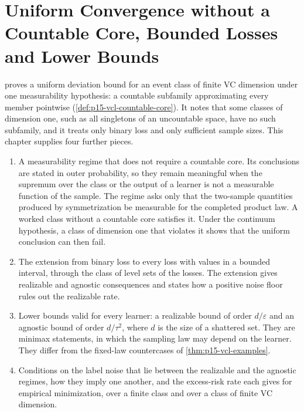 \chapter{Uniform Convergence without a Countable Core, Bounded Losses and Lower Bounds}
\label{sec:p15-w02b-p15-065-beyond-core}

 proves a uniform deviation
bound for an event class of finite VC dimension under one measurability
hypothesis: a countable subfamily approximating every member pointwise
(\cref{def:p15-vcl-countable-core}). It notes that some classes of
dimension one, such as all singletons of an uncountable space, have no such
subfamily, and it treats only binary loss and only sufficient sample sizes.
This chapter supplies four further pieces.
\begin{enumerate}
\item A measurability regime that does not require a countable core. Its
      conclusions are stated in outer probability, so they remain meaningful
      when the supremum over the class or the output of a learner is not a
      measurable function of the sample. The regime asks only that the
      two-sample quantities produced by symmetrization be measurable for the
      completed product law. A worked class without a countable core
      satisfies it. Under the continuum hypothesis, a class of dimension one
      that violates it shows that the uniform conclusion can then fail.
\item The extension from binary loss to every loss with values in a bounded
      interval, through the class of level sets of the losses. The extension
      gives realizable and agnostic consequences and states how a positive
      noise floor rules out the realizable rate.
\item Lower bounds valid for every learner: a realizable bound of order
      \(d/\varepsilon\) and an agnostic bound of order \(d/\tau^2\), where
      \(d\) is the size of a shattered set. They are minimax statements, in
      which the sampling law may depend on the learner. They differ from
      the fixed-law countercases of
      \cref{thm:p15-vcl-examples}.
\item Conditions on the label noise that lie between the realizable and the
      agnostic regimes, how they imply one another, and the excess-risk
      rate each gives for empirical minimization, over a finite class and
      over a class of finite VC dimension.
\end{enumerate}


